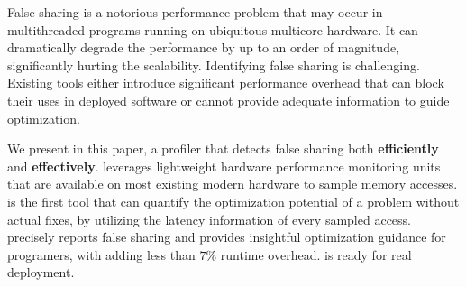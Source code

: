 
False sharing is a notorious performance problem that may occur in multithreaded programs running on ubiquitous multicore hardware. It can dramatically degrade the performance by up to an order of magnitude, significantly hurting the scalability. Identifying false sharing is challenging. Existing tools either introduce significant performance overhead that can block their uses in deployed software or cannot provide adequate information to guide optimization.

\sloppy
We present \cheetah{} in this paper, a profiler that detects false sharing both {\bf efficiently} and {\bf effectively}. \cheetah{} leverages lightweight hardware performance monitoring units that are available on most existing modern hardware to sample memory accesses. \cheetah{} is the first tool that can quantify the optimization potential of a problem without actual fixes, by utilizing the latency information of every sampled access. \cheetah{} precisely reports false sharing and provides insightful optimization guidance for programers, with adding less than $7\%$ runtime overhead. \Cheetah{} is ready for real deployment. 

